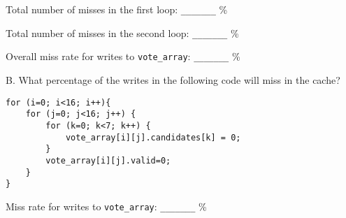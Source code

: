 Total number of misses in the first loop: \verb|_______| \%

Total number of misses in the second loop: \verb|_______| \%

Overall miss rate for writes to \verb|vote_array|: \verb|_______| \%

\vspace{0.25in}

B. What percentage of the writes in the following code will miss in the cache?

\begin{verbatim}
for (i=0; i<16; i++){
    for (j=0; j<16; j++) {
        for (k=0; k<7; k++) {
            vote_array[i][j].candidates[k] = 0;
        }
        vote_array[i][j].valid=0;
    }
}

\end{verbatim}


\vspace{0.25in}

Miss rate for writes to \verb|vote_array|: \verb|_______| \%

\vspace{0.25in}

